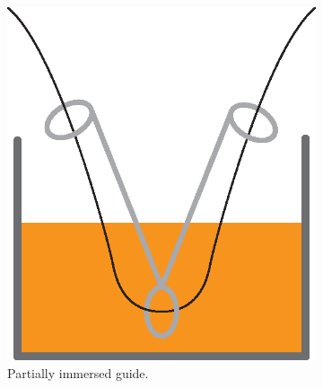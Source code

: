 \begin{figure}[h!]
        \centering
        \begin{subfigure}[b]{0.3\textwidth}
                \includegraphics[width=\textwidth]{./figures/external-dip-diagram}
                \caption{Partially immersed guide.}
                \label{fig:external-dip-diagram}
        \end{subfigure}%
        ~ %
        \begin{subfigure}[b]{0.3\textwidth}

\end{subfigure}
\end{figure}
